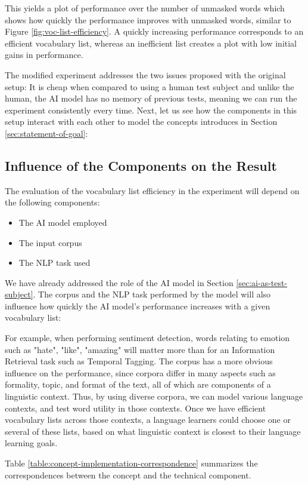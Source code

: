 This yields a plot of performance over the number of unmasked words which shows how quickly the performance improves with unmasked words, similar to Figure \ref{fig:voc-list-efficiency}.
A quickly increasing performance corresponds to an efficient vocabulary list, whereas an inefficient list creates a plot with low initial gains in performance.

The modified experiment addresses the two issues proposed with the original setup:
It is cheap when compared to using a human test subject and unlike the human, the AI model has no memory of previous tests, meaning we can run the experiment consistently every time.
Next, let us see how the components in this setup interact with each other to model the concepts introduces in Section \ref{sec:statement-of-goal}:

\subsection{Influence of the Components on the Result}
The evaluation of the vocabulary list efficiency in the experiment will depend on the following components:

\begin{itemize}
	\item The AI model employed
	\item The input corpus
	\item The NLP task used
\end{itemize}

We have already addressed the role of the AI model in Section \ref{sec:ai-as-test-subject}.
The corpus and the NLP task performed by the model will also influence how quickly the AI model's performance increases with a given vocabulary list:

For example, when performing sentiment detection, words relating to emotion such as "hate", "like", "amazing" will matter more than for an Information Retrieval task such as Temporal Tagging.
The corpus has a more obvious influence on the performance, since corpora differ in many aspects such as formality, topic, and format of the text, all of which are components of a linguistic context.
Thus, by using diverse corpora, we can model various language contexts, and test word utility in those contexts.
Once we have efficient vocabulary lists across those contexts, a language learners could choose one or several of these lists, based on what linguistic context is closest to their language learning goals.

Table \ref{table:concept-implementation-correspondence} summarizes the correspondences between the concept and the technical component.

